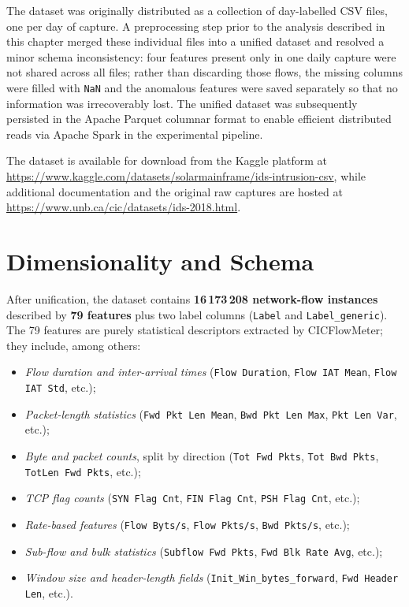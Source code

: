 The dataset was originally distributed as a collection of day-labelled CSV
files, one per day of capture.  A preprocessing step prior to the analysis
described in this chapter merged these individual files into a unified dataset
and resolved a minor schema inconsistency: four features present only in one
daily capture were not shared across all files; rather than discarding those
flows, the missing columns were filled with \texttt{NaN} and the anomalous
features were saved separately so that no information was irrecoverably lost.
The unified dataset was subsequently persisted in the Apache Parquet columnar
format to enable efficient distributed reads via Apache Spark in the
experimental pipeline.

The dataset is available for download from the Kaggle platform at
\url{https://www.kaggle.com/datasets/solarmainframe/ids-intrusion-csv}, while
additional documentation and the original raw captures are hosted at
\url{https://www.unb.ca/cic/datasets/ids-2018.html}.

\section{Dimensionality and Schema}
\label{sec:dataset-dimensionality}

After unification, the dataset contains \textbf{16\,173\,208 network-flow
instances} described by \textbf{79 features} plus two label columns
(\texttt{Label} and \texttt{Label\_generic}).
The 79 features are purely statistical descriptors extracted by CICFlowMeter;
they include, among others:

\begin{itemize}
  \item \emph{Flow duration and inter-arrival times} (\texttt{Flow Duration},
        \texttt{Flow IAT Mean}, \texttt{Flow IAT Std}, etc.);
  \item \emph{Packet-length statistics} (\texttt{Fwd Pkt Len Mean},
        \texttt{Bwd Pkt Len Max}, \texttt{Pkt Len Var}, etc.);
  \item \emph{Byte and packet counts}, split by direction (\texttt{Tot Fwd
        Pkts}, \texttt{Tot Bwd Pkts}, \texttt{TotLen Fwd Pkts}, etc.);
  \item \emph{TCP flag counts} (\texttt{SYN Flag Cnt}, \texttt{FIN Flag
        Cnt}, \texttt{PSH Flag Cnt}, etc.);
  \item \emph{Rate-based features} (\texttt{Flow Byts/s}, \texttt{Flow
        Pkts/s}, \texttt{Bwd Pkts/s}, etc.);
  \item \emph{Sub-flow and bulk statistics} (\texttt{Subflow Fwd Pkts},
        \texttt{Fwd Blk Rate Avg}, etc.);
  \item \emph{Window size and header-length fields}
        (\texttt{Init\_Win\_bytes\_forward}, \texttt{Fwd Header Len}, etc.).
\end{itemize}

